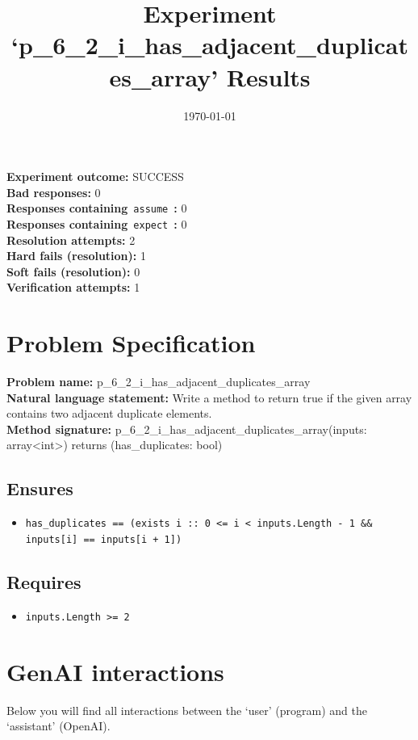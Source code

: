 \documentclass{article}
\begin{document}
\title{Experiment `p\_6\_2\_i\_has\_adjacent\_duplicates\_array' Results}
\author{\today}
\date{}
\maketitle
\textbf{Experiment outcome: }SUCCESS
\\\textbf{Bad responses: }0
\\\textbf{Responses containing}~\texttt{assume}~\textbf{: }0
\\\textbf{Responses containing}~\texttt{expect}~\textbf{: }0
\\\textbf{Resolution attempts: }2
\\\textbf{Hard fails (resolution): }1
\\\textbf{Soft fails (resolution): }0
\\\textbf{Verification attempts: }1
\section*{Problem Specification}
\textbf{Problem name: }p\_6\_2\_i\_has\_adjacent\_duplicates\_array
\\\textbf{Natural language statement: }Write a method to return true if the given array contains two adjacent duplicate elements.
\\\textbf{Method signature: }p\_6\_2\_i\_has\_adjacent\_duplicates\_array(inputs: array<int>) returns (has\_duplicates: bool)
\subsection*{Ensures}
\begin{itemize}
\item \texttt{has\_duplicates == (exists i :: 0 <= i < inputs.Length - 1 \&\& inputs[i] == inputs[i + 1])}
\end{itemize}
\subsection*{Requires}
\begin{itemize}
\item \texttt{inputs.Length >= 2}
\end{itemize}
\clearpage
\section*{GenAI interactions}
Below you will find all interactions between the `user' (program) and the `assistant' (OpenAI).
\end{document}
